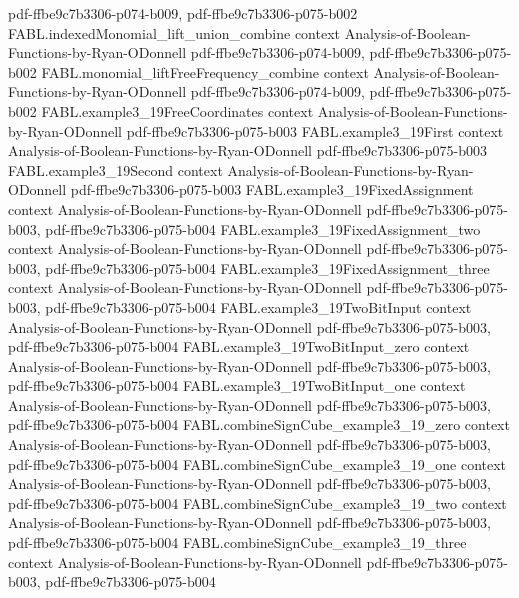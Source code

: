 \begin{theorem}
  {pdf-ffbe9c7b3306-p074-b009,
    pdf-ffbe9c7b3306-p075-b002}
\proofstep
  {FABL.indexedMonomial_lift_union_combine}
  {context}
  {Analysis-of-Boolean-Functions-by-Ryan-ODonnell}
  {pdf-ffbe9c7b3306-p074-b009,
    pdf-ffbe9c7b3306-p075-b002}
\proofstep
  {FABL.monomial_liftFreeFrequency_combine}
  {context}
  {Analysis-of-Boolean-Functions-by-Ryan-ODonnell}
  {pdf-ffbe9c7b3306-p074-b009,
    pdf-ffbe9c7b3306-p075-b002}
\proofstep
  {FABL.example3_19FreeCoordinates}
  {context}
  {Analysis-of-Boolean-Functions-by-Ryan-ODonnell}
  {pdf-ffbe9c7b3306-p075-b003}
\proofstep
  {FABL.example3_19First}
  {context}
  {Analysis-of-Boolean-Functions-by-Ryan-ODonnell}
  {pdf-ffbe9c7b3306-p075-b003}
\proofstep
  {FABL.example3_19Second}
  {context}
  {Analysis-of-Boolean-Functions-by-Ryan-ODonnell}
  {pdf-ffbe9c7b3306-p075-b003}
\proofstep
  {FABL.example3_19FixedAssignment}
  {context}
  {Analysis-of-Boolean-Functions-by-Ryan-ODonnell}
  {pdf-ffbe9c7b3306-p075-b003,
    pdf-ffbe9c7b3306-p075-b004}
\proofstep
  {FABL.example3_19FixedAssignment_two}
  {context}
  {Analysis-of-Boolean-Functions-by-Ryan-ODonnell}
  {pdf-ffbe9c7b3306-p075-b003,
    pdf-ffbe9c7b3306-p075-b004}
\proofstep
  {FABL.example3_19FixedAssignment_three}
  {context}
  {Analysis-of-Boolean-Functions-by-Ryan-ODonnell}
  {pdf-ffbe9c7b3306-p075-b003,
    pdf-ffbe9c7b3306-p075-b004}
\proofstep
  {FABL.example3_19TwoBitInput}
  {context}
  {Analysis-of-Boolean-Functions-by-Ryan-ODonnell}
  {pdf-ffbe9c7b3306-p075-b003,
    pdf-ffbe9c7b3306-p075-b004}
\proofstep
  {FABL.example3_19TwoBitInput_zero}
  {context}
  {Analysis-of-Boolean-Functions-by-Ryan-ODonnell}
  {pdf-ffbe9c7b3306-p075-b003,
    pdf-ffbe9c7b3306-p075-b004}
\proofstep
  {FABL.example3_19TwoBitInput_one}
  {context}
  {Analysis-of-Boolean-Functions-by-Ryan-ODonnell}
  {pdf-ffbe9c7b3306-p075-b003,
    pdf-ffbe9c7b3306-p075-b004}
\proofstep
  {FABL.combineSignCube_example3_19_zero}
  {context}
  {Analysis-of-Boolean-Functions-by-Ryan-ODonnell}
  {pdf-ffbe9c7b3306-p075-b003,
    pdf-ffbe9c7b3306-p075-b004}
\proofstep
  {FABL.combineSignCube_example3_19_one}
  {context}
  {Analysis-of-Boolean-Functions-by-Ryan-ODonnell}
  {pdf-ffbe9c7b3306-p075-b003,
    pdf-ffbe9c7b3306-p075-b004}
\proofstep
  {FABL.combineSignCube_example3_19_two}
  {context}
  {Analysis-of-Boolean-Functions-by-Ryan-ODonnell}
  {pdf-ffbe9c7b3306-p075-b003,
    pdf-ffbe9c7b3306-p075-b004}
\proofstep
  {FABL.combineSignCube_example3_19_three}
  {context}
  {Analysis-of-Boolean-Functions-by-Ryan-ODonnell}
  {pdf-ffbe9c7b3306-p075-b003,
    pdf-ffbe9c7b3306-p075-b004}
\proofstep

\end{theorem}
